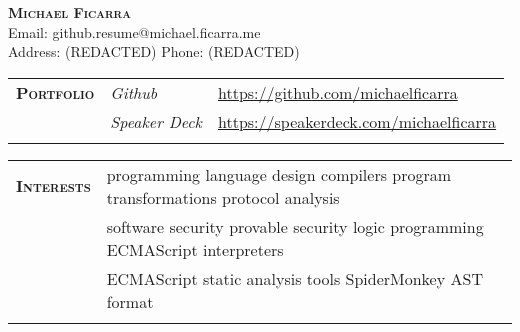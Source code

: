 \documentclass{report}
\newcommand{\middot}[2]{#1 \textbf{\textperiodcentered} #2}
\newcommand{\sectiontitle}[1]{{\textsc{\textbf{#1}}}}
\newcommand{\gutterwidth}[0]{3.0cm}
\newcommand{\extralinespacing}[0]{0.15cm}
\begin{document}
\begin{center}
  \sectiontitle{\Large Michael Ficarra} \\[\extralinespacing]
  Email: github.resume@michael.ficarra.me \\
  \middot{Address: (REDACTED)}{Phone: (REDACTED)} \\[\extralinespacing]
\end{center}

\begin{tabular}{@{}p{\gutterwidth}p{2cm}p{12cm}@{}}
  \sectiontitle{Portfolio}  &  {\em Github}        &  \url{https://github.com/michaelficarra} \\
                            &  {\em Speaker Deck}  &  \url{https://speakerdeck.com/michaelficarra} \\
  \\
\end{tabular}

\begin{tabular}{@{}p{\gutterwidth}p{14cm}@{}}
  \sectiontitle{Interests}
      &  \middot{programming language design}{\middot{compilers}{\middot{program transformations}{protocol analysis}}} \\
  {}  &  \middot{software security}{\middot{provable security}{\middot{logic programming}{ECMAScript interpreters}}} \\
  {}  &  \middot{ECMAScript static analysis tools}{SpiderMonkey AST format} \\
  \\
\end{tabular}
\end{document}
